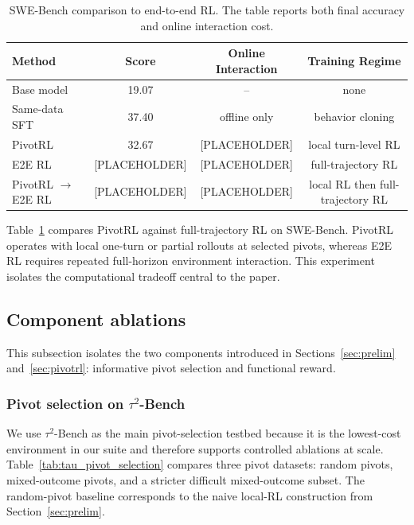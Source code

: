 \begin{table}[t]
\centering
\small
\begin{tabular}{lccc}
\toprule
\textbf{Method} & \textbf{Score} & \textbf{Online Interaction} & \textbf{Training Regime} \\
\midrule
Base model & 19.07 & -- & none \\
Same-data SFT & 37.40 & offline only & behavior cloning \\
PivotRL & 32.67 & [PLACEHOLDER] & local turn-level RL \\
E2E RL & [PLACEHOLDER] & [PLACEHOLDER] & full-trajectory RL \\
PivotRL $\rightarrow$ E2E RL & [PLACEHOLDER] & [PLACEHOLDER] & local RL then full-trajectory RL \\
\bottomrule
\end{tabular}
\caption{
SWE-Bench comparison to end-to-end RL.
The table reports both final accuracy and online interaction cost.
}
\label{tab:swe_e2e}
\end{table}

Table~\ref{tab:swe_e2e} compares PivotRL against full-trajectory RL on SWE-Bench. PivotRL operates with local one-turn or partial rollouts at selected pivots, whereas E2E RL requires repeated full-horizon environment interaction. This experiment isolates the computational tradeoff central to the paper.

\subsection{Component ablations}
\label{sec:component_ablations}

This subsection isolates the two components introduced in Sections~\ref{sec:prelim} and~\ref{sec:pivotrl}: informative pivot selection and functional reward.

\subsubsection{Pivot selection on $\tau^2$-Bench}
\label{sec:tau_pivot_ablation}

We use $\tau^2$-Bench as the main pivot-selection testbed because it is the lowest-cost environment in our suite and therefore supports controlled ablations at scale. Table~\ref{tab:tau_pivot_selection} compares three pivot datasets: random pivots, mixed-outcome pivots, and a stricter difficult mixed-outcome subset. The random-pivot baseline corresponds to the naive local-RL construction from Section~\ref{sec:prelim}.

